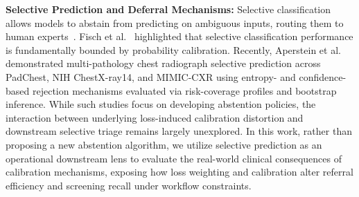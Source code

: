 \documentclass[preprint,12pt]{elsarticle}
\begin{document}
\textbf{Selective Prediction and Deferral Mechanisms:} Selective classification allows models to abstain from predicting on ambiguous inputs, routing them to human experts~\cite{geifman2017selective, kompa2021second}. Fisch et al.~\cite{fisch2022calibrated} highlighted that selective classification performance is fundamentally bounded by probability calibration. Recently, Aperstein et al.~\cite{aperstein2026knowing} demonstrated multi-pathology chest radiograph selective prediction across PadChest, NIH ChestX-ray14, and MIMIC-CXR using entropy- and confidence-based rejection mechanisms evaluated via risk-coverage profiles and bootstrap inference. While such studies focus on developing abstention policies, the interaction between underlying loss-induced calibration distortion and downstream selective triage remains largely unexplored. In this work, rather than proposing a new abstention algorithm, we utilize selective prediction as an operational downstream lens to evaluate the real-world clinical consequences of calibration mechanisms, exposing how loss weighting and calibration alter referral efficiency and screening recall under workflow constraints.
\end{document}
